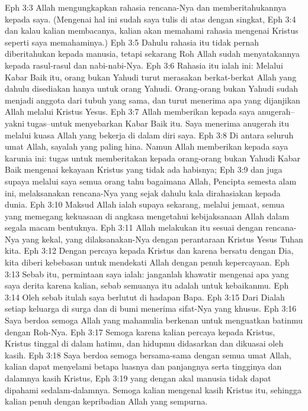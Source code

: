 Eph 3:3  Allah mengungkapkan rahasia rencana-Nya dan memberitahukannya kepada saya. (Mengenai hal ini sudah saya tulis di atas dengan singkat,
Eph 3:4  dan kalau kalian membacanya, kalian akan memahami rahasia mengenai Kristus seperti saya memahaminya.)
Eph 3:5  Dahulu rahasia itu tidak pernah diberitahukan kepada manusia, tetapi sekarang Roh Allah sudah menyatakannya kepada rasul-rasul dan nabi-nabi-Nya.
Eph 3:6  Rahasia itu ialah ini: Melalui Kabar Baik itu, orang bukan Yahudi turut merasakan berkat-berkat Allah yang dahulu disediakan hanya untuk orang Yahudi. Orang-orang bukan Yahudi sudah menjadi anggota dari tubuh yang sama, dan turut menerima apa yang dijanjikan Allah melalui Kristus Yesus.
Eph 3:7  Allah memberikan kepada saya anugerah--yakni tugas--untuk menyebarkan Kabar Baik itu. Saya menerima anugerah itu melalui kuasa Allah yang bekerja di dalam diri saya.
Eph 3:8  Di antara seluruh umat Allah, sayalah yang paling hina. Namun Allah memberikan kepada saya karunia ini: tugas untuk memberitakan kepada orang-orang bukan Yahudi Kabar Baik mengenai kekayaan Kristus yang tidak ada habisnya;
Eph 3:9  dan juga supaya melalui saya semua orang tahu bagaimana Allah, Pencipta semesta alam ini, melaksanakan rencana-Nya yang sejak dahulu kala dirahasiakan kepada dunia.
Eph 3:10  Maksud Allah ialah supaya sekarang, melalui jemaat, semua yang memegang kekuasaan di angkasa mengetahui kebijaksanaan Allah dalam segala macam bentuknya.
Eph 3:11  Allah melakukan itu sesuai dengan rencana-Nya yang kekal, yang dilaksanakan-Nya dengan perantaraan Kristus Yesus Tuhan kita.
Eph 3:12  Dengan percaya kepada Kristus dan karena bersatu dengan Dia, kita diberi kebebasan untuk mendekati Allah dengan penuh kepercayaan.
Eph 3:13  Sebab itu, permintaan saya ialah: janganlah khawatir mengenai apa yang saya derita karena kalian, sebab semuanya itu adalah untuk kebaikanmu.
Eph 3:14  Oleh sebab itulah saya berlutut di hadapan Bapa.
Eph 3:15  Dari Dialah setiap keluarga di surga dan di bumi menerima sifat-Nya yang khusus.
Eph 3:16  Saya berdoa semoga Allah yang mahamulia berkenan untuk menguatkan batinmu dengan Roh-Nya.
Eph 3:17  Semoga karena kalian percaya kepada Kristus, Kristus tinggal di dalam hatimu, dan hidupmu didasarkan dan dikuasai oleh kasih.
Eph 3:18  Saya berdoa semoga bersama-sama dengan semua umat Allah, kalian dapat menyelami betapa luasnya dan panjangnya serta tingginya dan dalamnya kasih Kristus,
Eph 3:19  yang dengan akal manusia tidak dapat dipahami sedalam-dalamnya. Semoga kalian mengenal kasih Kristus itu, sehingga kalian penuh dengan kepribadian Allah yang sempurna.
